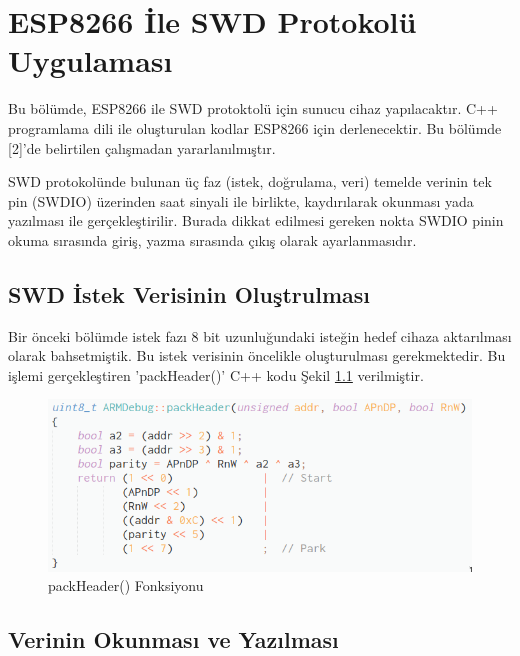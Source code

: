 \chapter{ESP8266 İle SWD Protokolü Uygulaması}

Bu bölümde, ESP8266 ile SWD protoktolü için sunucu cihaz yapılacaktır. C++ programlama dili ile oluşturulan kodlar ESP8266 için derlenecektir. Bu bölümde [2]'de belirtilen çalışmadan yararlanılmıştır.

SWD protokolünde bulunan üç faz (istek, doğrulama, veri) temelde verinin tek pin (SWDIO) üzerinden saat sinyali ile birlikte, kaydırılarak okunması yada yazılması ile gerçekleştirilir. Burada dikkat edilmesi gereken nokta SWDIO pinin okuma sırasında giriş, yazma sırasında çıkış olarak ayarlanmasıdır.


\section{SWD İstek Verisinin Oluştrulması}

Bir önceki bölümde istek fazı 8 bit uzunluğundaki isteğin hedef cihaza aktarılması olarak bahsetmiştik. Bu istek verisinin öncelikle oluşturulması gerekmektedir. Bu işlemi gerçekleştiren 'packHeader()' C++ kodu Şekil \ref{fig:packHeader} verilmiştir.

\begin{figure}[h]
\centering
\includegraphics[width=\textwidth]{gorseller/packHeader}
\caption{packHeader() Fonksiyonu}\label{fig:packHeader}
\end{figure}


\section{Verinin Okunması ve Yazılması}

